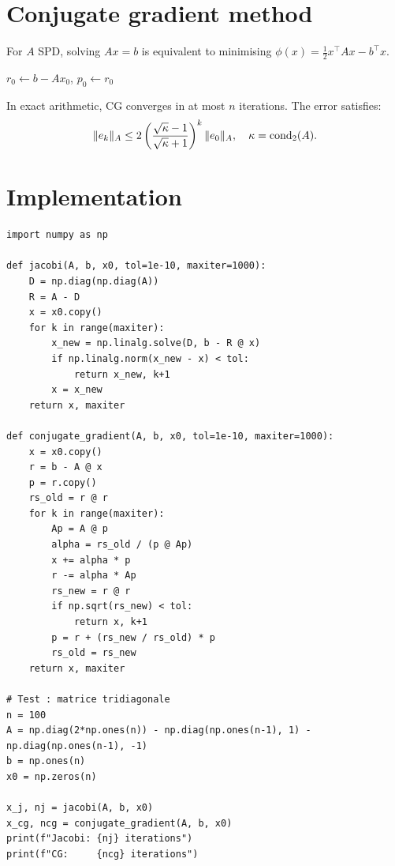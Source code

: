 \section{Conjugate gradient method}

\begin{definition}
For $A$ SPD, solving $Ax=b$ is equivalent to minimising $\phi(x)=\frac{1}{2}x^\top Ax-b^\top x$.
\end{definition}

\begin{algorithm}[H]
\caption{Conjugate gradient}\label{alg:cg}
$r_0\gets b-Ax_0$, $p_0\gets r_0$\;
\end{algorithm}

\begin{theorem}
In exact arithmetic, CG converges in at most $n$ iterations. The error satisfies:
\[
\|e_k\|_A \leq 2\left(\frac{\sqrt{\kappa}-1}{\sqrt{\kappa}+1}\right)^k\|e_0\|_A, \quad \kappa=\mathrm{cond}_2(A).
\]
\end{theorem}

\section{Implementation}

\begin{codeblock}[title=\textbf{Python}]
\begin{verbatim}
import numpy as np

def jacobi(A, b, x0, tol=1e-10, maxiter=1000):
    D = np.diag(np.diag(A))
    R = A - D
    x = x0.copy()
    for k in range(maxiter):
        x_new = np.linalg.solve(D, b - R @ x)
        if np.linalg.norm(x_new - x) < tol:
            return x_new, k+1
        x = x_new
    return x, maxiter

def conjugate_gradient(A, b, x0, tol=1e-10, maxiter=1000):
    x = x0.copy()
    r = b - A @ x
    p = r.copy()
    rs_old = r @ r
    for k in range(maxiter):
        Ap = A @ p
        alpha = rs_old / (p @ Ap)
        x += alpha * p
        r -= alpha * Ap
        rs_new = r @ r
        if np.sqrt(rs_new) < tol:
            return x, k+1
        p = r + (rs_new / rs_old) * p
        rs_old = rs_new
    return x, maxiter

# Test : matrice tridiagonale
n = 100
A = np.diag(2*np.ones(n)) - np.diag(np.ones(n-1), 1) - np.diag(np.ones(n-1), -1)
b = np.ones(n)
x0 = np.zeros(n)

x_j, nj = jacobi(A, b, x0)
x_cg, ncg = conjugate_gradient(A, b, x0)
print(f"Jacobi: {nj} iterations")
print(f"CG:     {ncg} iterations")
\end{verbatim}
\end{codeblock}

